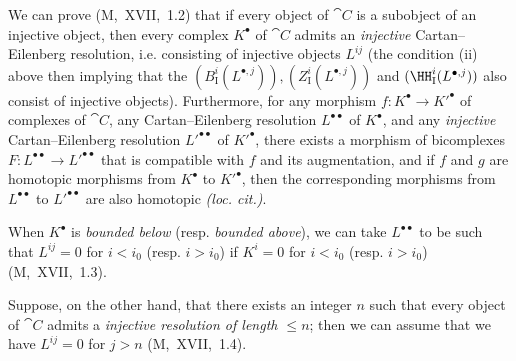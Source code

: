 \begin{env}[11.4.2]
We can prove (M,~XVII,~1.2) that if every object of $\cat{C}$ is a subobject of an injective object, then every complex $K^\bullet$ of $\cat{C}$ admits an \emph{injective} Cartan--Eilenberg resolution, i.e. consisting of injective objects $L^{ij}$ (the condition (ii) above then implying that the $(B_\mathrm{I}^i(L^{\bullet,j})), (Z_\mathrm{I}^i(L^{\bullet,j}))$ and $(\HH_\mathrm{I}^i(L^{\bullet,j}))$ also consist of injective objects).
Furthermore, for any morphism $f: K^\bullet \rightarrow K'^\bullet$ of complexes of $\cat{C}$, 
any Cartan--Eilenberg resolution $L^{\bullet\bullet}$ of $K^\bullet$, and any \emph{injective} Cartan--Eilenberg resolution $L'^{\bullet\bullet}$ of $K'^\bullet$, there exists a morphism of bicomplexes $F: L^{\bullet\bullet} \rightarrow L'^{\bullet\bullet}$ that is compatible with $f$ and its augmentation, and if $f$ and $g$ are homotopic morphisms from $K^\bullet$ to $K'^\bullet$, then the corresponding morphisms from $L^{\bullet\bullet}$ to $L'^{\bullet\bullet}$ are also homotopic \emph{(loc. cit.)}.

When $K^{\bullet}$ is \emph{bounded below} (resp. \emph{bounded above}), we can take $L^{\bullet\bullet}$ to be such that $L^{ij}=0$ for $i<i_0$ (resp. $i>i_0$) if $K^i=0$ for $i<i_0$ (resp. $i>i_0$) (M,~XVII,~1.3).

Suppose, on the other hand, that there exists an integer $n$ such that every object of $\cat{C}$ admits a \emph{injective resolution of length $\leq n$};
then we can assume that we have $L^{ij}=0$ for $j>n$ (M,~XVII,~1.4).
\end{env}


